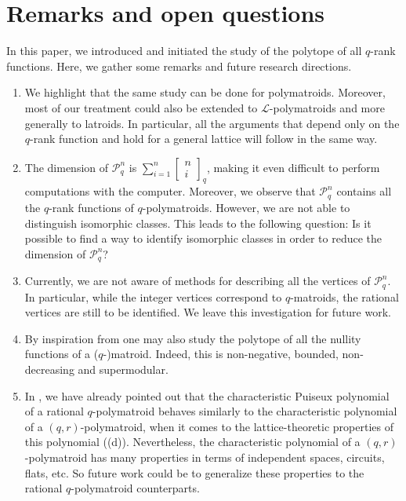 \documentclass[a4paper,11pt,reqno]{amsart}
\theoremstyle{definition}
\newcommand{\mL}{\mathcal{L}}
\newcommand{\RP}{\mathcal{P}_q^n}
\newcommand\qqbin[2]{\left[\begin{matrix} #1 \\ #2 \end{matrix} \right]}
\begin{document}
{%

\section{Remarks and open questions}\label{sec: final_remarks}

In this paper, we introduced and initiated the study of the polytope of all $q$-rank functions.
Here, we gather some remarks and future research directions. 

\begin{enumerate}
    \item[(a)] We highlight that the same study can be done for polymatroids. Moreover, most of our treatment could also be extended to $\mL$-polymatroids and more generally to latroids. In particular, all the arguments that depend only on the $q$-rank function and hold for a general lattice will follow in the same way.
    \item[(b)] The dimension of $\RP$ is $\sum\limits_{i=1}^n\qqbin{n}{i}_q$, making it even difficult to perform computations with the computer. Moreover, we observe that $\RP$
    contains all the $q$-rank functions of $q$-polymatroids. However, we are not able to distinguish isomorphic classes. This leads to the following question: Is it possible to find a way to identify isomorphic classes in order to reduce the dimension of $\RP$? 
    \item[(c)] Currently, we are not aware of methods for describing all the vertices of $\RP$. In particular, while the integer vertices correspond to $q$-matroids, the rational vertices are still to be identified. We leave this investigation for future work. 
    \item[(d)] By inspiration from \cite{grabisch2019cone} one may also study the polytope of all the nullity functions of a ($q$-)matroid. Indeed, this is non-negative, bounded, non-decreasing and supermodular.
    \item[(e)] In , we have already pointed out that the characteristic Puiseux polynomial of a rational $q$-polymatroid behaves similarly to the characteristic polynomial of a $(q,r)$-polymatroid, when it comes to the lattice-theoretic properties of this polynomial ((d)). Nevertheless, the characteristic polynomial of a $(q,r)$-polymatroid has many properties in terms of independent spaces, circuits, flats, etc. So future work could be to generalize these properties to the rational $q$-polymatroid counterparts.

\end{enumerate}}
\end{document}
